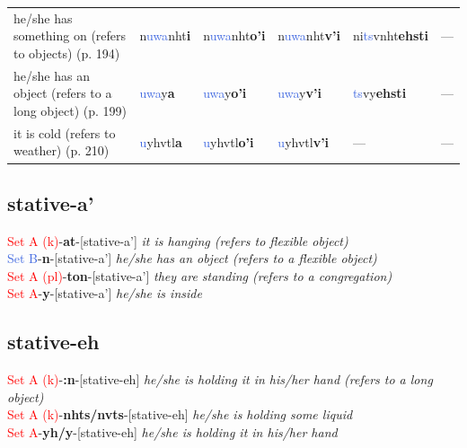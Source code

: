 \documentclass[oneside,openany]{book}%
\begin{document}
\begin{tabularx}{\textwidth}{>{\hsize=1.5\hsize\RaggedRight}X >{\hsize=0.9\hsize}X >{\hsize=0.9\hsize}X >{\hsize=0.9\hsize}X >{\hsize=0.9\hsize}X >{\hsize=0.9\hsize}X}
he/she has something on (refers to objects) (p. 194)&n\textcolor{RoyalBlue}{uwa}nht\textbf{i}&n\textcolor{RoyalBlue}{uwa}nht\textbf{o'i}&n\textcolor{RoyalBlue}{uwa}nht\textbf{v'i}&ni\textcolor{RoyalBlue}{ts}vnht\textbf{ehsti}&---\\%
he/she has an object (refers to a long object) (p. 199)&\textcolor{RoyalBlue}{uwa}y\textbf{a}&\textcolor{RoyalBlue}{uwa}y\textbf{o'i}&\textcolor{RoyalBlue}{uwa}y\textbf{v'i}&\textcolor{RoyalBlue}{ts}vy\textbf{ehsti}&---\\%
it is cold (refers to weather) (p. 210)&\textcolor{RoyalBlue}{u}yhvtl\textbf{a}&\textcolor{RoyalBlue}{u}yhvtl\textbf{o'i}&\textcolor{RoyalBlue}{u}yhvtl\textbf{v'i}&---&---\\%
\bottomrule%
\end{tabularx}%
\vspace{1em}%
\needspace{1in}%
\subsection*{stative-a'}%
\textcolor{Red}{Set A (k)}{-}\textbf{at}{-}[stative-a'] \textit{ it is hanging (refers to flexible object)} \\%
\textcolor{RoyalBlue}{Set B}{-}\textbf{n}{-}[stative-a'] \textit{ he/she has an object (refers to a flexible object)} \\%
\textcolor{Red}{Set A (pl)}{-}\textbf{ton}{-}[stative-a'] \textit{ they are standing (refers to a congregation)} \\%
\textcolor{Red}{Set A}{-}\textbf{y}{-}[stative-a'] \textit{ he/she is inside} \\%
\vspace{1em}%
\needspace{1in}%
\subsection*{stative-eh}%
\textcolor{Red}{Set A (k)}{-}\textbf{:n}{-}[stative-eh] \textit{ he/she is holding it in his/her hand (refers to a long object)} \\%
\textcolor{Red}{Set A (k)}{-}\textbf{nhts/nvts}{-}[stative-eh] \textit{ he/she is holding some liquid} \\%
\textcolor{Red}{Set A}{-}\textbf{yh/y}{-}[stative-eh] \textit{ he/she is holding it in his/her hand} \\%
\vspace{1em}%
\needspace{1in}%
\end{document}
